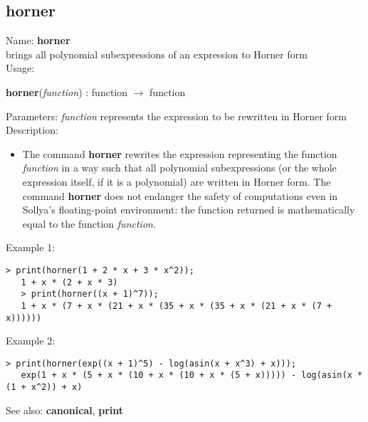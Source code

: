 \subsection{ horner }
\noindent Name: \textbf{horner}\\
brings all polynomial subexpressions of an expression to Horner form\\

\noindent Usage: 
\begin{center}
\textbf{horner}(\emph{function}) : \textsf{function} $\rightarrow$ \textsf{function}\\
\end{center}
Parameters: 
\emph{function} represents the expression to be rewritten in Horner form\\

\noindent Description: \begin{itemize}

\item The command \textbf{horner} rewrites the expression representing the function
   \emph{function} in a way such that all polynomial subexpressions (or the
   whole expression itself, if it is a polynomial) are written in Horner
   form.  The command \textbf{horner} does not endanger the safety of
   computations even in Sollya's floating-point environment: the
   function returned is mathematically equal to the function \emph{function}.
\end{itemize}
\noindent Example 1: 
\begin{center}\begin{minipage}{14.8cm}\begin{Verbatim}[frame=single]
   > print(horner(1 + 2 * x + 3 * x^2));
   1 + x * (2 + x * 3)
   > print(horner((x + 1)^7));
   1 + x * (7 + x * (21 + x * (35 + x * (35 + x * (21 + x * (7 + x))))))
\end{Verbatim}
\end{minipage}\end{center}
\noindent Example 2: 
\begin{center}\begin{minipage}{14.8cm}\begin{Verbatim}[frame=single]
   > print(horner(exp((x + 1)^5) - log(asin(x + x^3) + x)));
   exp(1 + x * (5 + x * (10 + x * (10 + x * (5 + x))))) - log(asin(x * (1 + x^2)) + x)
\end{Verbatim}
\end{minipage}\end{center}
See also: \textbf{canonical}, \textbf{print}

